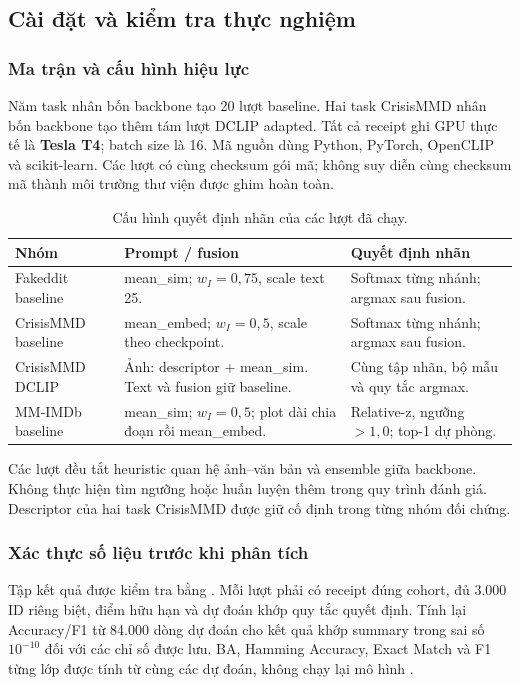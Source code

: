 \documentclass[12pt,a4paper]{article}
\begin{document}
\subsection{Cài đặt và kiểm tra thực nghiệm}
\subsubsection{Ma trận và cấu hình hiệu lực}
Năm task nhân bốn backbone tạo 20 lượt baseline. Hai task CrisisMMD nhân bốn backbone tạo thêm tám lượt DCLIP adapted. Tất cả receipt ghi GPU thực tế là \textbf{Tesla T4}; batch size là 16. Mã nguồn dùng Python, PyTorch, OpenCLIP và scikit-learn. Các lượt có cùng checksum gói mã; không suy diễn cùng checksum mã thành môi trường thư viện được ghim hoàn toàn.
\begin{table}[H]\centering\small
\caption{Cấu hình quyết định nhãn của các lượt đã chạy.}\label{tab:settings}
\begin{tabular}{p{}p{}p{}}\toprule
\textbf{Nhóm}&\textbf{Prompt / fusion}&\textbf{Quyết định nhãn}\\\midrule
Fakeddit baseline&mean\_sim; $w_I=0,75$, scale text 25.&Softmax từng nhánh; argmax sau fusion.\\
CrisisMMD baseline&mean\_embed; $w_I=0,5$, scale theo checkpoint.&Softmax từng nhánh; argmax sau fusion.\\
CrisisMMD DCLIP&Ảnh: descriptor + mean\_sim. Text và fusion giữ baseline.&Cùng tập nhãn, bộ mẫu và quy tắc argmax.\\
MM-IMDb baseline&mean\_sim; $w_I=0,5$; plot dài chia đoạn rồi mean\_embed.&Relative-z, ngưỡng $>1,0$; top-1 dự phòng.\\
\bottomrule\end{tabular}\end{table}

Các lượt đều tắt heuristic quan hệ ảnh--văn bản và ensemble giữa backbone. Không thực hiện tìm ngưỡng hoặc huấn luyện thêm trong quy trình đánh giá. Descriptor của hai task CrisisMMD được giữ cố định trong từng nhóm đối chứng.

\subsubsection{Xác thực số liệu trước khi phân tích}
Tập kết quả được kiểm tra bằng . Mỗi lượt phải có receipt đúng cohort, đủ 3.000 ID riêng biệt, điểm hữu hạn và dự đoán khớp quy tắc quyết định. Tính lại Accuracy/F1 từ 84.000 dòng dự đoán cho kết quả khớp summary trong sai số $10^{-10}$ đối với các chỉ số được lưu. BA, Hamming Accuracy, Exact Match và F1 từng lớp được tính từ cùng các dự đoán, không chạy lại mô hình \cite{resultaudit}.
\end{document}
